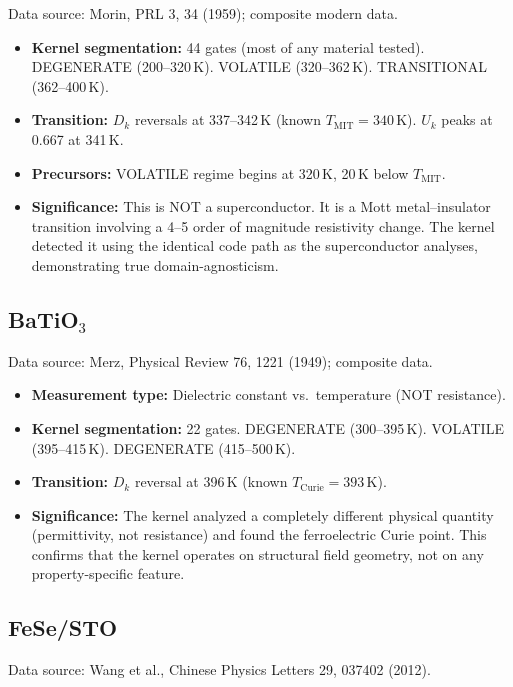 \documentclass[11pt,letterpaper]{article}
\begin{document}
Data source: Morin, PRL 3, 34 (1959); composite modern data.

\begin{itemize}
  \item \textbf{Kernel segmentation:} 44 gates (most of any material tested).
    DEGENERATE (200--320\,K). VOLATILE (320--362\,K). TRANSITIONAL (362--400\,K).
  \item \textbf{Transition:} $D_k$ reversals at 337--342\,K
    (known $T_{\text{MIT}} = 340$\,K). $U_k$ peaks at 0.667 at 341\,K.
  \item \textbf{Precursors:} VOLATILE regime begins at 320\,K,
    20\,K below $T_{\text{MIT}}$.
  \item \textbf{Significance:} This is NOT a superconductor. It is a
    Mott metal--insulator transition involving a 4--5 order of magnitude
    resistivity change. The kernel detected it using the identical code
    path as the superconductor analyses, demonstrating true
    domain-agnosticism.
\end{itemize}

\subsection{BaTiO$_3$}

Data source: Merz, Physical Review 76, 1221 (1949); composite data.

\begin{itemize}
  \item \textbf{Measurement type:} Dielectric constant vs.\ temperature
    (NOT resistance).
  \item \textbf{Kernel segmentation:} 22 gates.
    DEGENERATE (300--395\,K). VOLATILE (395--415\,K). DEGENERATE (415--500\,K).
  \item \textbf{Transition:} $D_k$ reversal at 396\,K
    (known $T_{\text{Curie}} = 393$\,K).
  \item \textbf{Significance:} The kernel analyzed a completely
    different physical quantity (permittivity, not resistance) and
    found the ferroelectric Curie point. This confirms that the kernel
    operates on structural field geometry, not on any property-specific
    feature.
\end{itemize}

\subsection{FeSe/STO}

Data source: Wang et al., Chinese Physics Letters 29, 037402 (2012).
\end{document}
